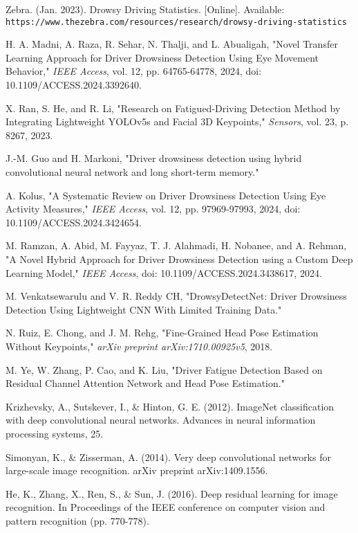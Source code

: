 \documentclass[a4paper,12pt]{report}
\begin{document}
\onehalfspacing


\setlength{\parskip}{\baselineskip}


\begin{thebibliography}{9} %

Zebra. (Jan. 2023). Drowsy Driving Statistics. [Online]. Available:  
\texttt{https://www.thezebra.com/resources/research/drowsy-driving-statistics}

H. A. Madni, A. Raza, R. Sehar, N. Thalji, and L. Abualigah,  
"Novel Transfer Learning Approach for Driver Drowsiness Detection Using Eye Movement Behavior,"  
\textit{IEEE Access}, vol. 12, pp. 64765-64778, 2024, doi: 10.1109/ACCESS.2024.3392640.

X. Ran, S. He, and R. Li,  
"Research on Fatigued-Driving Detection Method by Integrating Lightweight YOLOv5s and Facial 3D Keypoints,"  
\textit{Sensors}, vol. 23, p. 8267, 2023.

J.-M. Guo and H. Markoni,  
"Driver drowsiness detection using hybrid convolutional neural network and long short-term memory."

A. Kolus,  
"A Systematic Review on Driver Drowsiness Detection Using Eye Activity Measures,"  
\textit{IEEE Access}, vol. 12, pp. 97969-97993, 2024, doi: 10.1109/ACCESS.2024.3424654.

M. Ramzan, A. Abid, M. Fayyaz, T. J. Alahmadi, H. Nobanee, and A. Rehman,  
"A Novel Hybrid Approach for Driver Drowsiness Detection using a Custom Deep Learning Model,"  
\textit{IEEE Access}, doi: 10.1109/ACCESS.2024.3438617, 2024.

M. Venkatsewarulu and V. R. Reddy CH,  
"DrowsyDetectNet: Driver Drowsiness Detection Using Lightweight CNN With Limited Training Data."

N. Ruiz, E. Chong, and J. M. Rehg,  
"Fine-Grained Head Pose Estimation Without Keypoints,"  
\textit{arXiv preprint arXiv:1710.00925v5}, 2018.

M. Ye, W. Zhang, P. Cao, and K. Liu,  
"Driver Fatigue Detection Based on Residual Channel Attention Network and Head Pose Estimation."

Krizhevsky, A., Sutskever, I., \& Hinton, G. E. (2012). ImageNet classification with deep convolutional neural networks. Advances in neural information processing systems, 25.

Simonyan, K., \& Zisserman, A. (2014). Very deep convolutional networks for large-scale image recognition. arXiv preprint arXiv:1409.1556.

He, K., Zhang, X., Ren, S., \& Sun, J. (2016). Deep residual learning for image recognition. In Proceedings of the IEEE conference on computer vision and pattern recognition (pp. 770-778).


\end{thebibliography}
\end{document}
